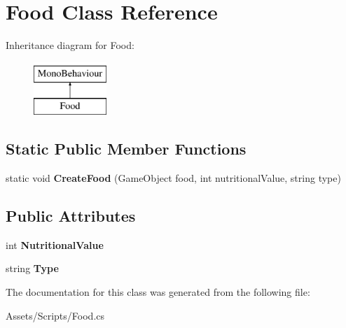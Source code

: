 \hypertarget{class_food}{}\section{Food Class Reference}
\label{class_food}
Inheritance diagram for Food\+:\begin{figure}[H]
\begin{center}
\leavevmode
\includegraphics[height=2.000000cm]{class_food}
\end{center}
\end{figure}
\subsection*{Static Public Member Functions}
\begin{DoxyCompactItemize}
\item 
static void {\bfseries Create\+Food} (Game\+Object food, int nutritional\+Value, string type)\hypertarget{class_food_ad909bec75236a3bf3f61755d080227a0}{}\label{class_food_ad909bec75236a3bf3f61755d080227a0}

\end{DoxyCompactItemize}
\subsection*{Public Attributes}
\begin{DoxyCompactItemize}
\item 
int {\bfseries Nutritional\+Value}\hypertarget{class_food_a222e6263d31b64e4c65609ba4688e7df}{}\label{class_food_a222e6263d31b64e4c65609ba4688e7df}

\item 
string {\bfseries Type}\hypertarget{class_food_ada3faa0f6a0b38caccd3b5930126b919}{}\label{class_food_ada3faa0f6a0b38caccd3b5930126b919}

\end{DoxyCompactItemize}


The documentation for this class was generated from the following file\+:\begin{DoxyCompactItemize}
\item 
Assets/\+Scripts/Food.\+cs\end{DoxyCompactItemize}

